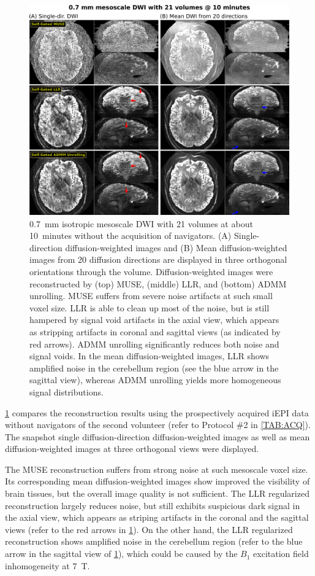 \documentclass[AMA,STIX2COL,Linenumberson]{MRM}
\begin{document}
\begin{figure}
	\centering
	\includegraphics[width=\textwidth]{./figures/fig6.png}
	\caption{0.7~mm isotropic mesoscale DWI with 21 volumes at about 10~minutes
		without the acquisition of navigators.
		(A) Single-direction diffusion-weighted images and
		(B) Mean diffusion-weighted images from 20 diffusion directions are displayed in three orthogonal orientations through the volume.
		Diffusion-weighted images were reconstructed by
		(top) MUSE, (middle) LLR, and (bottom) ADMM unrolling.
		MUSE suffers from severe noise artifacts at such small voxel size.
		LLR is able to clean up most of the noise,
		but is still hampered by signal void artifacts in the axial view,
		which appears as stripping artifacts in coronal and sagittal views
		(as indicated by red arrows).
		ADMM unrolling significantly reduces both noise and signal voids.
		In the mean diffusion-weighted images, LLR shows amplified noise
		in the cerebellum region (see the blue arrow in the sagittal view),
		whereas ADMM unrolling yields more homogeneous signal distributions.}
	\label{FIG:MOTION_PROS}
\end{figure}

\cref{FIG:MOTION_PROS} compares the reconstruction results
using the prospectively acquired iEPI data without navigators
of the second volunteer
(refer to Protocol \#2 in \cref{TAB:ACQ}).
The snapshot single diffusion-direction diffusion-weighted images
as well as mean diffusion-weighted images
at three orthogonal views were displayed.

The MUSE reconstruction suffers from strong noise
at such mesoscale voxel size.
Its corresponding mean diffusion-weighted images show
improved the visibility of brain tissues,
but the overall image quality is not sufficient.
The LLR regularized reconstruction largely reduces noise,
but still exhibits suspicious dark signal in the axial view,
which appears as striping artifacts in the coronal and the sagittal views
(refer to the red arrows in \cref{FIG:MOTION_PROS}).
On the other hand, the LLR regularized reconstruction
shows amplified noise in the cerebellum region
(refer to the blue arrow in the sagittal view of \cref{FIG:MOTION_PROS}),
which could be caused by the $B_1$ excitation field inhomogeneity
at \SI{7}{\tesla}.
\end{document}
